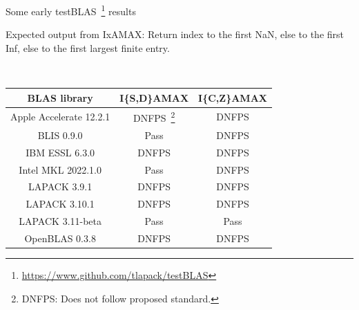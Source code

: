 \documentclass[11pt]{beamer}
\begin{document}
\begin{frame}{Some early testBLAS~\footnote{\url{https://www.github.com/tlapack/testBLAS}} results}

	Expected output from IxAMAX: Return index to the first NaN, else to the first Inf, else to the first largest finite entry.

	~\\
		\centering
		\begin{tabular}{|c|c|c|}
			\hline
			BLAS library & I\{S,D\}AMAX & I\{C,Z\}AMAX \\\hline
			Apple Accelerate 12.2.1 & {DNFPS~\footnote{DNFPS: Does not follow proposed standard.}} & {DNFPS} \\\hline
			BLIS 0.9.0 & {\color{codegreen} Pass} & {DNFPS} \\\hline
			IBM ESSL 6.3.0 & {DNFPS} & {DNFPS} \\\hline
			Intel MKL 2022.1.0 & {\color{codegreen} Pass} & {DNFPS} \\\hline
			LAPACK 3.9.1 & {DNFPS} & {DNFPS} \\\hline
			LAPACK 3.10.1 & {DNFPS} & {DNFPS} \\\hline
			LAPACK 3.11-beta & {\color{codegreen} Pass} & {\color{codegreen} Pass} \\\hline
			OpenBLAS 0.3.8 & {DNFPS} & {DNFPS} \\\hline
		\end{tabular}


\end{frame}
\end{document}
